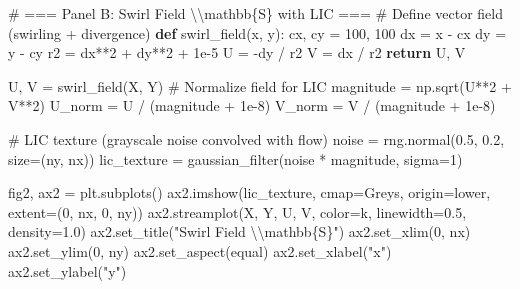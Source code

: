 \documentclass[
  11pt,
]{article}
\newenvironment{Shaded}{\begin{snugshade}}{\end{snugshade}}
\newcommand{\CharTok}[1]{\textcolor[rgb]{0.13,0.47,0.30}{#1}}
\newcommand{\CommentTok}[1]{\textcolor[rgb]{0.37,0.37,0.37}{#1}}
\newcommand{\ControlFlowTok}[1]{\textcolor[rgb]{0.00,0.23,0.31}{\textbf{#1}}}
\newcommand{\DecValTok}[1]{\textcolor[rgb]{0.68,0.00,0.00}{#1}}
\newcommand{\FloatTok}[1]{\textcolor[rgb]{0.68,0.00,0.00}{#1}}
\newcommand{\KeywordTok}[1]{\textcolor[rgb]{0.00,0.23,0.31}{\textbf{#1}}}
\newcommand{\NormalTok}[1]{\textcolor[rgb]{0.00,0.23,0.31}{#1}}
\newcommand{\OperatorTok}[1]{\textcolor[rgb]{0.37,0.37,0.37}{#1}}
\newcommand{\SpecialCharTok}[1]{\textcolor[rgb]{0.37,0.37,0.37}{#1}}
\newcommand{\StringTok}[1]{\textcolor[rgb]{0.13,0.47,0.30}{#1}}
\begin{document}
\begin{Shaded}
\begin{Highlighting}[]
\CommentTok{\# === Panel B: Swirl Field \textbackslash{}\textbackslash{}mathbb\{S\} with LIC ===}
\CommentTok{\# Define vector field (swirling + divergence)}
\KeywordTok{def}\NormalTok{ swirl\_field(x, y):}
\NormalTok{    cx, cy }\OperatorTok{=} \DecValTok{100}\NormalTok{, }\DecValTok{100}
\NormalTok{    dx }\OperatorTok{=}\NormalTok{ x }\OperatorTok{{-}}\NormalTok{ cx}
\NormalTok{    dy }\OperatorTok{=}\NormalTok{ y }\OperatorTok{{-}}\NormalTok{ cy}
\NormalTok{    r2 }\OperatorTok{=}\NormalTok{ dx}\OperatorTok{**}\DecValTok{2} \OperatorTok{+}\NormalTok{ dy}\OperatorTok{**}\DecValTok{2} \OperatorTok{+} \FloatTok{1e{-}5}
\NormalTok{    U }\OperatorTok{=} \OperatorTok{{-}}\NormalTok{dy }\OperatorTok{/}\NormalTok{ r2}
\NormalTok{    V }\OperatorTok{=}\NormalTok{ dx }\OperatorTok{/}\NormalTok{ r2}
    \ControlFlowTok{return}\NormalTok{ U, V}

\NormalTok{U, V }\OperatorTok{=}\NormalTok{ swirl\_field(X, Y)}
\CommentTok{\# Normalize field for LIC}
\NormalTok{magnitude }\OperatorTok{=}\NormalTok{ np.sqrt(U}\OperatorTok{**}\DecValTok{2} \OperatorTok{+}\NormalTok{ V}\OperatorTok{**}\DecValTok{2}\NormalTok{)}
\NormalTok{U\_norm }\OperatorTok{=}\NormalTok{ U }\OperatorTok{/}\NormalTok{ (magnitude }\OperatorTok{+} \FloatTok{1e{-}8}\NormalTok{)}
\NormalTok{V\_norm }\OperatorTok{=}\NormalTok{ V }\OperatorTok{/}\NormalTok{ (magnitude }\OperatorTok{+} \FloatTok{1e{-}8}\NormalTok{)}

\CommentTok{\# LIC texture (grayscale noise convolved with flow)}
\NormalTok{noise }\OperatorTok{=}\NormalTok{ rng.normal(}\FloatTok{0.5}\NormalTok{, }\FloatTok{0.2}\NormalTok{, size}\OperatorTok{=}\NormalTok{(ny, nx))}
\NormalTok{lic\_texture }\OperatorTok{=}\NormalTok{ gaussian\_filter(noise }\OperatorTok{*}\NormalTok{ magnitude, sigma}\OperatorTok{=}\DecValTok{1}\NormalTok{)}

\NormalTok{fig2, ax2 }\OperatorTok{=}\NormalTok{ plt.subplots()}
\NormalTok{ax2.imshow(lic\_texture, cmap}\OperatorTok{=}\StringTok{\textquotesingle{}Greys\textquotesingle{}}\NormalTok{, origin}\OperatorTok{=}\StringTok{\textquotesingle{}lower\textquotesingle{}}\NormalTok{, extent}\OperatorTok{=}\NormalTok{(}\DecValTok{0}\NormalTok{, nx, }\DecValTok{0}\NormalTok{, ny))}
\NormalTok{ax2.streamplot(X, Y, U, V, color}\OperatorTok{=}\StringTok{\textquotesingle{}k\textquotesingle{}}\NormalTok{, linewidth}\OperatorTok{=}\FloatTok{0.5}\NormalTok{, density}\OperatorTok{=}\FloatTok{1.0}\NormalTok{)}
\NormalTok{ax2.set\_title(}\StringTok{"Swirl Field }\CharTok{\textbackslash{}\textbackslash{}}\StringTok{mathbb}\SpecialCharTok{\{S\}}\StringTok{"}\NormalTok{)}
\NormalTok{ax2.set\_xlim(}\DecValTok{0}\NormalTok{, nx)}
\NormalTok{ax2.set\_ylim(}\DecValTok{0}\NormalTok{, ny)}
\NormalTok{ax2.set\_aspect(}\StringTok{\textquotesingle{}equal\textquotesingle{}}\NormalTok{)}
\NormalTok{ax2.set\_xlabel(}\StringTok{"x"}\NormalTok{)}
\NormalTok{ax2.set\_ylabel(}\StringTok{"y"}\NormalTok{)}


\end{Highlighting}
\end{Shaded}
\end{document}
